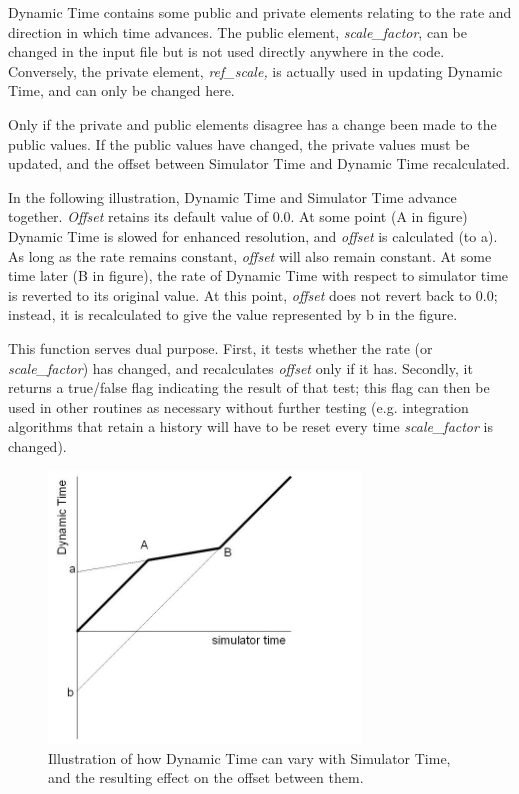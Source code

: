 {\begin{enumerate}
{\begin{enumerate}
Dynamic Time contains some public and private elements relating to the rate
and direction in which time advances.  The public element,
\textit{scale\_factor}, can be changed in the input file but is not
used directly anywhere in the code.  Conversely, the private
element,\textit{ ref\_scale,} is actually used in updating Dynamic Time, and
can only be changed here.

Only if the private and public elements disagree has a change been made
to the public values.  If the public values have changed, the private
values must be updated, and the offset between Simulator Time and Dynamic Time
recalculated.  

In the following illustration, Dynamic Time and Simulator Time advance
together.  \textit{Offset} retains its default value of 0.0.  At some
point (A in figure) Dynamic Time is slowed for enhanced resolution, and
\textit{offset} is calculated (to a).  As long as the rate remains
constant, \textit{offset} will also remain constant.  At some time
later (B in figure), the rate of Dynamic Time with respect to simulator
time is reverted to its original value.  At this point, \textit{offset} does
not revert back to 0.0; instead, it is recalculated to give the value
represented by b in the figure.

This function serves dual purpose.  First, it tests whether the rate (or
\textit{scale\_factor}) has changed, and recalculates \textit{offset}
only if it has.  Secondly, it returns a true/false flag indicating the
result of that test; this flag can then be used in other routines as
necessary without further testing (e.g. integration algorithms that
retain a history will have to be reset every time
\textit{scale\_factor} is changed).

\begin{figure}[htp]
\begin{center}
\includegraphics[width=3.2736in,height=2.85in]{figures/Timedyntime.jpg}
\caption{Illustration of how Dynamic Time can vary with Simulator Time, 
and the resulting effect on the offset between them.}
\end{center}
\end{figure}


\end{enumerate}}
\end{enumerate}}
